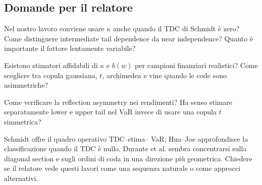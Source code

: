 \documentclass[11pt,a4paper]{article}
\begin{document}
\subsection*{Domande per il relatore}
\begin{description}[leftmargin=3.1cm,style=nextline]
  \item[Concettuali] Nel nostro lavoro conviene usare $\kappa$ anche quando
  il TDC di Schmidt è zero? Come distinguere intermediate tail dependence da
  near independence? Quanto è importante il fattore lentamente variabile?
  \item[Metodologiche] Esistono stimatori affidabili di $\kappa$ e $b(w)$ per
  campioni finanziari realistici? Come scegliere tra copula gaussiana, $t$,
  archimedea e vine quando le code sono asimmetriche?
  \item[Empiriche] Come verificare la reflection asymmetry nei rendimenti? Ha
  senso stimare separatamente lower e upper tail nel VaR invece di usare una
  copula $t$ simmetrica?
  \item[Collegamento ai paper] Schmidt offre il quadro operativo TDC--stima--
  VaR; Hua--Joe approfondisce la classificazione quando il TDC è nullo.
  Durante et al. sembra concentrarsi sulla diagonal section e sugli ordini di
  coda in una direzione più geometrica. Chiedere se il relatore vede questi
  lavori come una sequenza naturale o come approcci alternativi.
\end{description}
\end{document}
